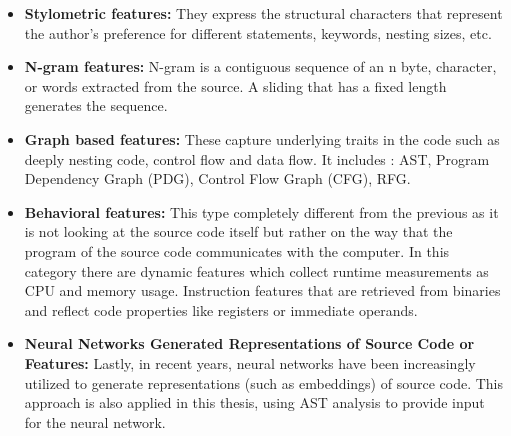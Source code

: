 \documentclass[conference]{IEEEtran}
\begin{document}
\begin{itemize}

    \item \textbf{Stylometric features:} 
    They express the structural characters that represent the author’s preference for different statements, keywords, nesting sizes, etc.
    \item \textbf{N-gram features:}
    N-gram is a contiguous sequence of an n byte, character, or words extracted from the source. A sliding that has a fixed length generates 
    the sequence.
    \item \textbf{Graph based features:}
    These capture underlying traits in the code such as deeply nesting code, control flow and data flow.
    It includes : AST, Program Dependency Graph (PDG), Control Flow Graph (CFG), RFG.
    \item \textbf{Behavioral features:}
    This type completely different from the previous as it is not looking at the source code itself
    but rather on the way that the program of the source code communicates with the computer.
    In this category there are dynamic features which collect runtime measurements as CPU and memory usage.
    Instruction features that are retrieved from binaries and reflect code properties like registers or immediate operands.
    \item \textbf{Neural Networks Generated Representations of Source Code or Features:}
    Lastly, in recent years, neural networks have been increasingly utilized 
    to generate representations (such as embeddings) of source code. This 
    approach is also applied in this thesis, using AST analysis to provide 
    input for the neural network.

\end{itemize}
\end{document}
